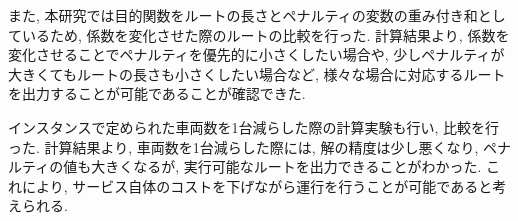 また, 本研究では目的関数をルートの長さとペナルティの変数の重み付き和としているため, 係数を変化させた際のルートの比較を行った. 計算結果より, 係数を変化させることでペナルティを優先的に小さくしたい場合や, 少しペナルティが大きくてもルートの長さも小さくしたい場合など, 様々な場合に対応するルートを出力することが可能であることが確認できた.

インスタンスで定められた車両数を1台減らした際の計算実験も行い, 比較を行った. 計算結果より, 車両数を1台減らした際には, 解の精度は少し悪くなり, ペナルティの値も大きくなるが, 実行可能なルートを出力できることがわかった. これにより, サービス自体のコストを下げながら運行を行うことが可能であると考えられる.
